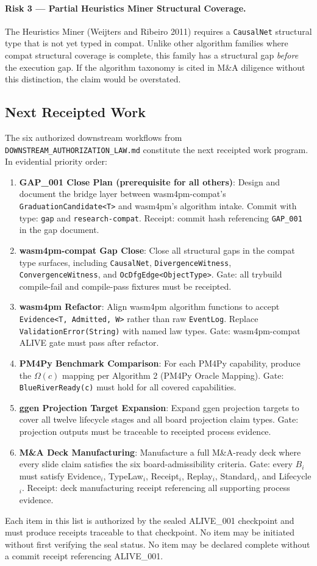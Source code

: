 \paragraph{Risk 3 --- Partial Heuristics Miner Structural Coverage.} The Heuristics Miner
(Weijters and Ribeiro 2011) requires a \texttt{CausalNet} structural type that is not yet
typed in compat. Unlike other algorithm families where compat structural coverage is complete,
this family has a structural gap \emph{before} the execution gap. If the algorithm taxonomy
is cited in M\&A diligence without this distinction, the claim would be overstated.

\subsection{Next Receipted Work}
\label{sec:doctrine-open-next}

The six authorized downstream workflows from \texttt{DOWNSTREAM\_AUTHORIZATION\_LAW.md}
constitute the next receipted work program. In evidential priority order:

\begin{enumerate}
  \item \textbf{GAP\_001 Close Plan (prerequisite for all others)}: Design and document the
    bridge layer between wasm4pm-compat's \texttt{GraduationCandidate\textless{}T\textgreater{}}
    and wasm4pm's algorithm intake. Commit with type: \texttt{gap} and
    \texttt{research-compat}. Receipt: commit hash referencing \texttt{GAP\_001} in the gap
    document.
  \item \textbf{wasm4pm-compat Gap Close}: Close all structural gaps in the compat type
    surfaces, including \texttt{CausalNet}, \texttt{DivergenceWitness},
    \texttt{ConvergenceWitness}, and \texttt{OcDfgEdge\textless{}ObjectType\textgreater{}}.
    Gate: all trybuild compile-fail and compile-pass fixtures must be receipted.
  \item \textbf{wasm4pm Refactor}: Align wasm4pm algorithm functions to accept
    \texttt{Evidence\textless{}T, Admitted, W\textgreater{}} rather than raw
    \texttt{EventLog}. Replace \texttt{ValidationError(String)} with named law types.
    Gate: wasm4pm-compat ALIVE gate must pass after refactor.
  \item \textbf{PM4Py Benchmark Comparison}: For each PM4Py capability, produce the
    $\Omega(c)$ mapping per Algorithm 2 (PM4Py Oracle Mapping). Gate:
    \texttt{BlueRiverReady(c)} must hold for all covered capabilities.
  \item \textbf{ggen Projection Target Expansion}: Expand ggen projection targets to cover all
    twelve lifecycle stages and all board projection claim types. Gate: projection outputs
    must be traceable to receipted process evidence.
  \item \textbf{M\&A Deck Manufacturing}: Manufacture a full M\&A-ready deck where every
    slide claim satisfies the six board-admissibility criteria. Gate: every $B_i$ must
    satisfy Evidence$_i$, TypeLaw$_i$, Receipt$_i$, Replay$_i$, Standard$_i$, and
    Lifecycle$_i$. Receipt: deck manufacturing receipt referencing all supporting process
    evidence.
\end{enumerate}

Each item in this list is authorized by the sealed ALIVE\_001 checkpoint and must produce
receipts traceable to that checkpoint. No item may be initiated without first verifying the
seal status. No item may be declared complete without a commit receipt referencing
ALIVE\_001.
